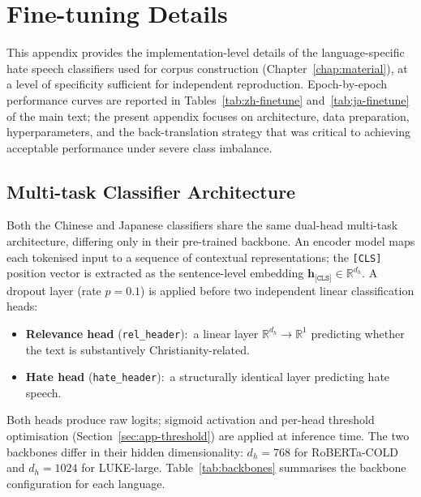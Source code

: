\documentclass[../CLthesis.tex]{subfiles}
\begin{document}
\chapter{Fine-tuning Details}%
\label{appendix:finetuning}

This appendix provides the implementation-level details of the language-specific hate speech classifiers used for corpus construction (Chapter~\ref{chap:material}), at a level of specificity sufficient for independent reproduction. Epoch-by-epoch performance curves are reported in Tables~\ref{tab:zh-finetune} and~\ref{tab:ja-finetune} of the main text; the present appendix focuses on architecture, data preparation, hyperparameters, and the back-translation strategy that was critical to achieving acceptable performance under severe class imbalance.

\section{Multi-task Classifier Architecture}
\label{sec:app-arch}

Both the Chinese and Japanese classifiers share the same dual-head multi-task architecture, differing only in their pre-trained backbone. An encoder model maps each tokenised input to a sequence of contextual representations; the \texttt{[CLS]} position vector is extracted as the sentence-level embedding $\mathbf{h}_\texttt{[CLS]} \in \mathbb{R}^{d_h}$. A dropout layer (rate $p = 0.1$) is applied before two independent linear classification heads:

\begin{itemize}
  \item \textbf{Relevance head} (\texttt{rel\_header}):\ a linear layer $\mathbb{R}^{d_h} \to \mathbb{R}^1$ predicting whether the text is substantively Christianity-related.
  \item \textbf{Hate head} (\texttt{hate\_header}):\ a structurally identical layer predicting hate speech.
\end{itemize}

\noindent Both heads produce raw logits; sigmoid activation and per-head threshold optimisation (Section~\ref{sec:app-threshold}) are applied at inference time. The two backbones differ in their hidden dimensionality: $d_h = 768$ for RoBERTa-COLD and $d_h = 1024$ for LUKE-large. Table~\ref{tab:backbones} summarises the backbone configuration for each language.
\end{document}
